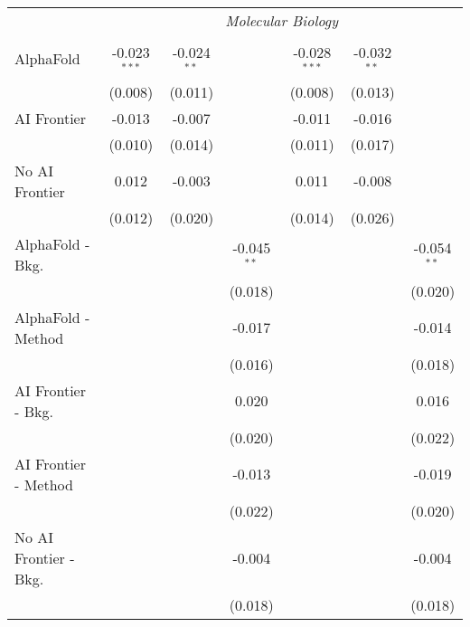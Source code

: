 \begin{tabular}{lcccccc}
 & \multicolumn{6}{c}{\textit{Molecular Biology}} \\ \\
   AlphaFold               & -0.023$^{***}$ & -0.024$^{**}$ &               & -0.028$^{***}$ & -0.032$^{**}$ &   \\   
                           & (0.008)        & (0.011)       &               & (0.008)        & (0.013)       &   \\   
   AI Frontier             & -0.013         & -0.007        &               & -0.011         & -0.016        &   \\   
                           & (0.010)        & (0.014)       &               & (0.011)        & (0.017)       &   \\   
   No AI Frontier          & 0.012          & -0.003        &               & 0.011          & -0.008        &   \\   
                           & (0.012)        & (0.020)       &               & (0.014)        & (0.026)       &   \\   
   AlphaFold - Bkg.        &                &               & -0.045$^{**}$ &                &               & -0.054$^{**}$\\   
                           &                &               & (0.018)       &                &               & (0.020)\\   
   AlphaFold - Method      &                &               & -0.017        &                &               & -0.014\\   
                           &                &               & (0.016)       &                &               & (0.018)\\   
   AI Frontier - Bkg.      &                &               & 0.020         &                &               & 0.016\\   
                           &                &               & (0.020)       &                &               & (0.022)\\   
   AI Frontier - Method    &                &               & -0.013        &                &               & -0.019\\   
                           &                &               & (0.022)       &                &               & (0.020)\\   
   No AI Frontier - Bkg.   &                &               & -0.004        &                &               & -0.004\\   
                           &                &               & (0.018)       &                &               & (0.018)\\   

\end{tabular}
